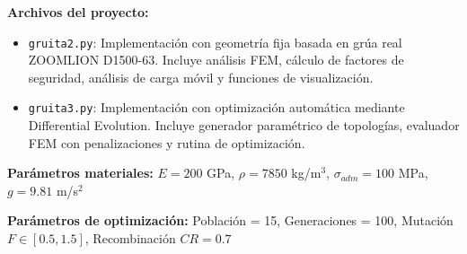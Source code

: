 \documentclass[10pt,a4paper]{article}
\begin{document}
\textbf{Archivos del proyecto:}
\begin{itemize}
\item \texttt{gruita2.py}: Implementación con geometría fija basada en grúa real ZOOMLION D1500-63. Incluye análisis FEM, cálculo de factores de seguridad, análisis de carga móvil y funciones de visualización.
\item \texttt{gruita3.py}: Implementación con optimización automática mediante Differential Evolution. Incluye generador paramétrico de topologías, evaluador FEM con penalizaciones y rutina de optimización.
\end{itemize}

\textbf{Parámetros materiales:} $E = 200$ GPa, $\rho = 7850$ kg/m$^3$, $\sigma_{adm} = 100$ MPa, $g = 9.81$ m/s$^2$

\textbf{Parámetros de optimización:} Población = 15, Generaciones = 100, Mutación $F \in [0.5, 1.5]$, Recombinación $CR = 0.7$
\end{document}
